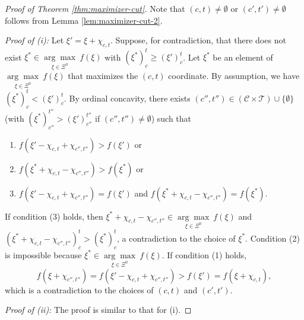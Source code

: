 \documentclass[12pt]{amsart}
\theoremstyle{remark}
\begin{document}
\begin{proof}[Proof of Theorem \ref{thm:maximizer-cut}]
Note that $(c,t)\neq \emptyset$ or $(c',t')\neq \emptyset$ follows from Lemma \ref{lem:maximizer-cut-2}.

\smallskip
\noindent
\emph{Proof of (i):}
Let $\xi'=\xi+\chi_{c,t}$. Suppose, for contradiction, that there does not exist $\xi^*\in \underset {\xi\in \Xi^0} {\arg\max} \: f(\xi)$ with $(\xi^*)_{c}^{t}\geq (\xi')_{c}^{t}$.  Let $\xi^*$ be an element of $\underset {\xi\in \Xi^0} {\arg\max} \: f(\xi)$ that maximizes the $(c,t)$ coordinate. By assumption, we have $(\xi^*)_{c}^{t}<(\xi')_{c}^{t}$. By ordinal concavity, there exists $(c'',t'') \in (\mathcal{C}\times \mathcal{T})\cup\{\emptyset\}$ (with $(\xi^*)_{c''}^{t''}>(\xi')_{c''}^{t''}$ if $(c'',t'')\neq \emptyset$) such that
\begin{enumerate}
\item $f(\xi'-\chi_{c,t}+\chi_{c'',t''})>f(\xi')$ or
\item $f(\xi^*+\chi_{c,t}-\chi_{c'',t''})>f(\xi^*)$ or
\item $f(\xi'-\chi_{c,t}+\chi_{c'',t''})=f(\xi')$ and $f(\xi^*+\chi_{c,t}-\chi_{c'',t''})=f(\xi^*)$.
\end{enumerate}
If condition (3) holds, then $\xi^*+\chi_{c,t}-\chi_{c'',t''}\in \underset {\xi\in \Xi^0} {\arg\max} \: f(\xi)$ and $(\xi^*+\chi_{c,t}-\chi_{c'',t''})_{c}^{t}>(\xi^*)_{c}^{t}$, a contradiction to the choice of $\xi^*$. Condition (2) is impossible because $\xi^*\in \underset {\xi\in \Xi^0} {\arg\max} \: f(\xi)$. If condition (1) holds,
$$
f(\xi+\chi_{c'',t''})=f(\xi'-\chi_{c,t}+\chi_{c'',t''})>f(\xi')=f(\xi+\chi_{c,t}),
$$
which is a contradiction to the choices of $(c,t)$ and $(c',t')$.

\smallskip
\noindent
\emph{Proof of (ii):} The proof is similar to that for (i).


\end{proof}
\end{document}
